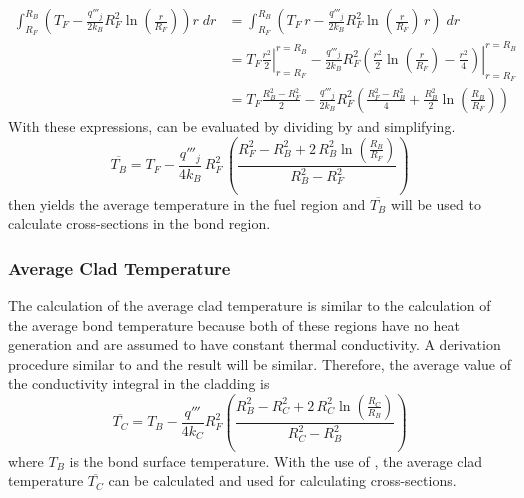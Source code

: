       \begin{align}
        \int_{R_F}^{R_B} \left( T_F - \frac{q'''_j}{2 k_B} R_F^2
          \ln\left(\frac{r}{R_F}\right) \right) r \; dr 
          &= \int_{R_F}^{R_B}
          \left( T_F \, r - \frac{q'''_j}{2 k_B}R_F^2
          \ln\left(\frac{r}{R_F}\right) \, r \right) \; dr \\
        &=
          \left. T_F \frac{r^2}{2} \right|_{r=R_F}^{r=R_B} - 
          \left. \frac{q'''_j}{2 k_B}R_F^2 \left( \frac{r^2}{2}
          \ln\left(\frac{r}{R_F}\right) - \frac{r^2}{4} \right)
          \right|_{r=R_F}^{r=R_B} \\
        \label{eq:tbbar_numerator}
        &= 
          T_F \frac{R_B^2-R_F^2}{2} - \frac{q'''_j}{2 k_B} R_F^2
          \left( \frac{R_F^2 - R_B^2}{4} + \frac{R_B^2}{2}
          \ln\left(\frac{R_B}{R_F}\right) \right)
      \end{align}
      With these expressions,  can be evaluated by dividing
       by  and simplifying.
      \begin{equation}
        \label{eq:tb_bar}
        \overline{T_B} = T_F - \frac{q'''_j}{4 k_B} \, R_F^2 \, \left(
          \frac{R_F^2 - R_B^2 + 2\,R_B^2 \ln\left(\frac{R_B}{R_F}\right)}
          {R_B^2-R_F^2}\right)
      \end{equation}
       then yields the average temperature in the fuel region
      and $\overline{T_B}$ will be used to calculate cross-sections in the bond
      region.

    \subsubsection{Average Clad Temperature}
      The calculation of the average clad temperature is similar to the
      calculation of the average bond temperature because both of these regions
      have no heat generation and are assumed to have constant thermal
      conductivity. A derivation procedure similar to
       and the result will be similar. Therefore,
      the average value of the conductivity integral in the cladding is 
      \begin{equation}
        \label{eq:tc_bar}
        \overline{T_C} = T_B - \frac{q'''}{4 k_C} R_F^2 \left(
          \frac{R_B^2 - R_C^2 + 2 \, R_C^2 \ln\left(\frac{R_C}{R_B}\right)}
          {R_C^2 - R_B^2} \right)
      \end{equation}
      where $T_B$ is the bond surface temperature. With the use of
      , the average clad temperature $\overline{T_C}$ can be
      calculated and used for calculating cross-sections.

